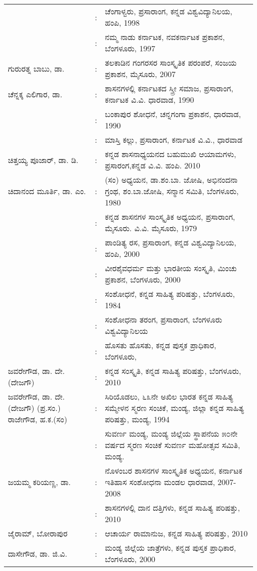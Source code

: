 \begin{longtable}[l]{@{}>{\raggedright}p{4.7cm}cp{9.2cm}<{\raggedright}@{}}
& : & ಚೆಂಗಾಳ್ವರು, ಪ್ರಸಾರಾಂಗ, ಕನ್ನಡ ವಿಶ್ವವಿದ್ಯಾನಿಲಯ, ಹಂಪಿ, 1998\\
& : & ನಮ್ಮ ನಾಡು ಕರ್ನಾಟಕ, ನವಕರ್ನಾಟಕ ಪ್ರಕಾಶನ, ಬೆಂಗಳೂರು, 1997\\
ಗುರುರತ್ನ ಬಾಬು, ಡಾ. & : &  ತಲಕಾಡಿನ ಗಂಗರಸರ ಸಾಂಸ್ಕೃತಿಕ ಪರಂಪರೆ, ಸಂಜಯ ಪ್ರಕಾಶನ, ಮೈಸೂರು, 2007\\
ಚೆನ್ನಕ್ಕ ಎಲಿಗಾರ, ಡಾ. & : &  ಶಾಸನಗಳಲ್ಲಿ ಕರ್ನಾಟಕದ ಸ್ತ್ರೀ ಸಮಾಜ, ಪ್ರಸಾರಾಂಗ, ಕರ್ನಾಟಕ ವಿ.ವಿ. ಧಾರವಾಡ, 1990\\
& : & ಬಂಕಾಪುರ ಶೋಧನೆ, ಚನ್ನಗಂಗಾ ಪ್ರಕಾಶನ, ಧಾರವಾಡ, 1990\\
& : & ಮಾಸ್ತಿ ಕಲ್ಲು, ಪ್ರಸಾರಾಂಗ, ಕರ್ನಾಟಕ ವಿ.ವಿ., ಧಾರವಾಡ\\
ಚಿತ್ತಯ್ಯ ಪೂಜಾರ್​, ಡಾ. ಡಿ. & : &  ಕನ್ನಡ ಶಾಸನಾಧ್ಯಯನದ ಬಹುಮುಖಿ ಆಯಾಮಗಳು, ಪ್ರಸಾರಂಗ,\newline ಕನ್ನಡ ವಿ.ವಿ. ಹಂಪಿ. 2010\\
ಚಿದಾನಂದ ಮೂರ್ತಿ, ಡಾ. ಎಂ.  & : & (ಸಂ) ಅಧ್ಯಯನ, ಡಾ.ಶಂ.ಬಾ. ಜೋಷಿ, ಅಭಿನಂದನಾ ಗ್ರಂಥ, ಶಂ.ಬಾ.ಜೋಷಿ, ಸನ್ಮಾನ ಸಮಿತಿ, ಬೆಂಗಳೂರು, 1980\\
& : & ಕನ್ನಡ ಶಾಸನಗಳ ಸಾಂಸ್ಕೃತಿಕ ಅಧ್ಯಯನ, ಪ್ರಸಾರಾಂಗ, ಮೈಸೂರು. ವಿ.ವಿ. ಮೈಸೂರು, 1979\\
& : & ಪಾಂಡಿತ್ಯ ರಸ, ಪ್ರಸಾರಾಂಗ, ಕನ್ನಡ ವಿಶ್ವವಿದ್ಯಾನಿಲಯ, ಹಂಪಿ, 2000\\
& : & ವೀರಶೈವಧರ್ಮ ಮತ್ತು ಭಾರತೀಯ ಸಂಸ್ಕೃತಿ, ಮಿಂಚು ಪ್ರಕಾಶನ, ಬೆಂಗಳೂರು, 2000\\
& : &  ಸಂಶೋಧನೆ, ಕನ್ನಡ ಸಾಹಿತ್ಯ ಪರಿಷತ್ತು, ಬೆಂಗಳೂರು, 1984\\
& : & ಸಂಶೋಧನಾ ತರಂಗ, ಪ್ರಸಾರಾಂಗ, ಬೆಂಗಳೂರು ವಿಶ್ವವಿದ್ಯಾನಿಲಯ\\
& : & ಹೊಸತು ಹೊಸತು, ಕನ್ನಡ ಪುಸ್ತಕ ಪ್ರಾಧಿಕಾರ, ಬೆಂಗಳೂರು,\\
ಜವರೇಗೌಡ, ಡಾ. ದೇ. (ದೇಜಗೌ) & : & ಕನ್ನಡ ಸಂಸ್ಕೃತಿ, ಕನ್ನಡ ಸಾಹಿತ್ಯ ಪರಿಷತ್ತು, ಬೆಂಗಳೂರು, 2010\\
ಜವರೇಗೌಡ, ಡಾ. ದೇ.(ದೇಜಗೌ) (ಪ್ರ.ಸಂ.) ರಾಜೇಗೌಡ, ಹ.ಕ.(ಸಂ) & : & ಸಿರಿಯೊಡಲು, ೬೩ನೇ ಅಖಿಲ ಭಾರತ ಕನ್ನಡ ಸಾಹಿತ್ಯ ಸಮ್ಮೇಳನ ಸ್ಮರಣ ಸಂಚಿಕೆ, ಮಂಡ್ಯ, ಜಿಲ್ಲಾ ಕನ್ನಡ ಸಾಹಿತ್ಯ ಪರಿಷತ್ತು, ಮಂಡ್ಯ, 1994\\
& : & ಸುವರ್ಣ ಮಂಡ್ಯ, ಮಂಡ್ಯ ಜಿಲ್ಲೆಯ ಸ್ಥಾಪನೆಯ ೫೦ನೇ ವರ್ಷದ ಸ್ಮರಣ ಸಂಚಿಕೆ ಸುವರ್ಣ ಮಹೋತ್ಸವ ಸಮಿತಿ, ಮಂಡ್ಯ.\\
ಜಯಮ್ಮ ಕರಿಯಣ್ಣ, ಡಾ. & : & ನೊಳಂಬರ ಶಾಸನಗಳ ಸಾಂಸ್ಕೃತಿಕ ಅಧ್ಯಯನ, ಕರ್ನಾಟಕ ಇತಿಹಾಸ ಸಂಶೋಧನಾ ಮಂಡಲ ಧಾರವಾಡ, 2007-2008\\
& : & ಶಾಸನಗಳಲ್ಲಿ ದಾನ ದತ್ತಿಗಳು, ಕನ್ನಡ ಸಾಹಿತ್ಯ ಪರಿಷತ್ತು, 2010\\
ಜೈರಾಮ್, ಬೋರಾಪುರ & : &  ಆಚಾರ್ಯ ರಾಮಾನುಜ, ಕನ್ನಡ ಸಾಹಿತ್ಯ ಪರಿಷತ್ತು, 2010\\
ದಾಸೇಗೌಡ, ಡಾ. ಜಿ.ವಿ. & : &  ಮಂಡ್ಯ ಜಿಲ್ಲೆಯ ಜಾತ್ರೆಗಳು, ಕನ್ನಡ ಪುಸ್ತಕ ಪ್ರಾಧಿಕಾರ, ಬೆಂಗಳೂರು, 2000\\

\end{longtable}
